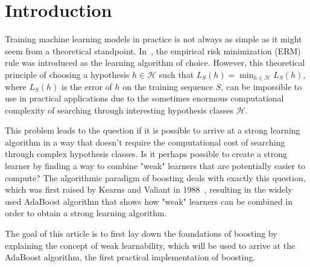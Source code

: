 \section{Introduction}

Training machine learning models in practice is not always as simple as it might seem from a theoretical standpoint.
In~\cite[chapter 2]{SSBD14}, the empirical risk minimization (ERM) rule was introduced as the learning algorithm
of choice.
However, this theoretical principle of choosing a hypothesis \mbox{$h \in \mathcal{H}$} such that
$L_S(h) = \min_{h \in \mathcal{H}} L_S(h)$, where $L_S(h)$ is the error of $h$ on the training sequence $S$,
can be impossible to use in practical applications due to the sometimes enormous computational complexity of searching
through interesting hypothesis classes $\mathcal{H}$.

This problem leads to the question if it is possible to arrive at a strong learning algorithm in a way that doesn't require the
computational cost of searching through complex hypothesis classes.
Is it perhaps possible to create a strong learner by finding a way to combine "weak" learners that are potentially easier to compute?
The algorithmic paradigm of boosting deals with exactly this question, 
which was first raised by Kearns and Valiant in 1988~\cite{kv-lbffahf-88}, 
resulting in the widely used AdaBoost algorithm that
shows how "weak" learners can be combined in order to obtain a strong learning algorithm.

The goal of this article is to first lay down the foundations of boosting by explaining the concept of weak 
learnability, which will be used to arrive at the AdaBoost algorithm, the first practical implementation of boosting.
